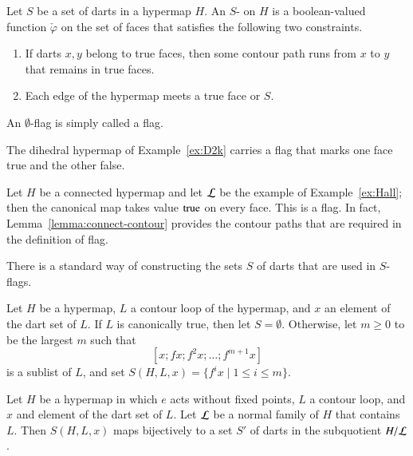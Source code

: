 \begin{definition}[flag]\label{def:flag} 
  Let $S$ be a set of darts in a hypermap $H$.  An $S$-
  on $H$ is a boolean-valued function $\check\varphi$ on the set of faces that
  satisfies the following two constraints.
\begin{enumerate}
\item If darts $x,y$ belong to true faces,
then  some contour path runs from $x$ to $y$ that remains
in true faces.
\item Each edge of the hypermap meets a true face or $S$.
\end{enumerate}
An $\emptyset$-flag is simply called a flag.
%
%
\end{definition}



\begin{example} 
The dihedral hypermap of Example~\ref{ex:D2k} carries a
flag that marks one face true and the other false.
\end{example}

\begin{example}\label{ex:Hall-flag} 
Let $H$ be a connected hypermap and let $\cal L$ be the example of
Example~\ref{ex:Hall}; then the canonical map takes value
${\operatorname{true}}$ on every face.  This is a flag. In fact,
Lemma~\ref{lemma:connect-contour} provides the contour paths that
are required in the definition of flag.
\end{example}



There is a standard way of constructing the sets $S$ of darts that
 are used in $S$-flags.  


\begin{definition}[S]
Let $H$ be a hypermap, $L$ a contour loop of the hypermap,
and $x$ an element of the dart set of $L$.
If  $L$ is  canonically true, then let $S=\emptyset$.
Otherwise,
let $m\ge0$ to be the largest $m$ 
such that 
\[ 
[x;f x; f^2 x;\ldots;f^{m+1} x]
\]   
is a sublist of $L$, and
set $S(H,L,x) = \{f^i x \mid 1 \le i\le m\}$.
\end{definition}

\begin{lemma}\label{lemma:flag-set-subquotient}
Let $H$ be a hypermap in which $e$ acts without fixed points, 
$L$ a contour loop, and $x$ and element of the dart set of $L$.
Let ${\cal L}$ be a normal family of $H$ that contains $L$.
Then $S(H,L,x)$ maps bijectively to a set $S'$ of darts in the subquotient $H/{\cal L}$.
\end{lemma}

